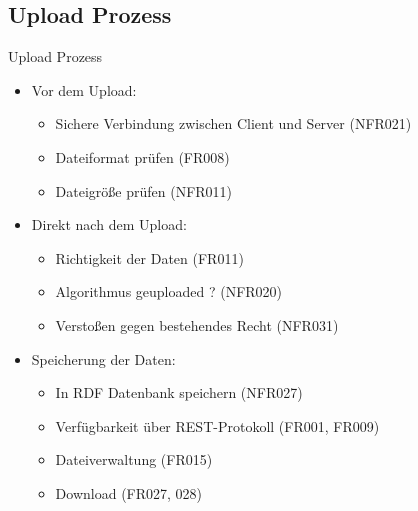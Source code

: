 \documentclass{beamer}
\begin{document}
	\subsection[Upload Prozess]{Upload Prozess}
	\begin{frame}[<+->][t]{Upload Prozess}
		\begin{itemize}		
			\item Vor dem Upload:
			\begin{itemize}	
				\item Sichere Verbindung zwischen Client und Server (NFR021)
				\item Dateiformat prüfen (FR008)
				\item Dateigröße prüfen (NFR011)
			\end{itemize}
			
			\item Direkt nach dem Upload:
			\begin{itemize}	
				\item Richtigkeit der Daten (FR011)
				\item Algorithmus geuploaded ? (NFR020)
				\item Verstoßen gegen bestehendes Recht (NFR031)
			\end{itemize}

			\item Speicherung der Daten:
			\begin{itemize}	
				\item In RDF Datenbank speichern (NFR027)
				\item Verfügbarkeit über REST-Protokoll (FR001, FR009)
				\item Dateiverwaltung (FR015)
				\item Download (FR027, 028)
			\end{itemize}
		\end{itemize}
	\end{frame}
		
\end{document}
